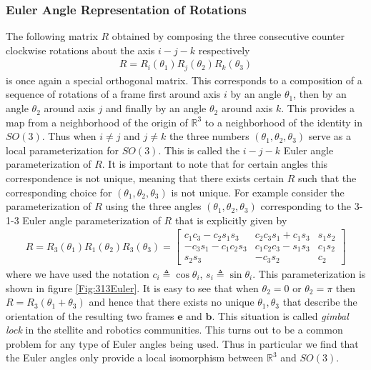 \documentclass[graybox,envcountchap,sectrefs]{svmonoMuga}
\begin{document}




\subsubsection{Euler Angle Representation of Rotations}\label{Secn:EulerAngles}



The following matrix $R$ obtained by composing the three consecutive counter clockwise rotations about the axis $i-j-k$ respectively 
\begin{align}\label{eq:EulerAngles}
R=R_i(\theta_1)R_j(\theta_2)R_k(\theta_3)
\end{align}
is once again a special orthogonal matrix. This corresponds to a composition of a sequence of rotations of a frame first around axis $i$ by an angle $\theta_1$, then by an angle $\theta_2$ around axis $j$ and finally by an angle $\theta_2$ around axis $k$. This provides a map from a neighborhood of the origin of $\mathbb{R}^3$ to a neighborhood of the identity in $SO(3)$. Thus when $i\neq j$ and $j\neq k$ the three numbers $(\theta_1,\theta_2,\theta_3)$ serve as a local parameterization for $SO(3)$. This is called the $i-j-k$ Euler angle parameterization of $R$. It is 
important to note that for certain angles this correspondence is not unique, meaning that there exists certain $R$ such that the corresponding choice for $(\theta_1,\theta_2,\theta_3)$ is not unique.
For example consider the parameterization of $R$ using the three angles $(\theta_1,\theta_2,\theta_3)$ corresponding to the 3-1-3 Euler angle parameterization of $R$ that is explicitly given by
\begin{align}\label{eq:EulerAngles313}
R=R_3(\theta_1)R_1(\theta_2)R_3(\theta_3)=\begin{bmatrix}
c_1c_3-c_2s_1s_3 & c_2c_3s_1+c_1s_3 & s_1s_2  \\
-c_3s_1-c_1c_2s_3 & c_1c_2c_3-s_1s_3 & c_1s_2\\
s_2s_3 & -c_3s_2 & c_2\end{bmatrix}
\end{align}
where we have used the notation $c_i\triangleq \cos{\theta_i}$, $s_i\triangleq \sin{\theta_i}$. This parameterization is shown in figure \ref{Fig:313Euler}. 
It is easy to see that  when $\theta_2=0$ or $\theta_2=\pi$ then $R=R_3(\theta_1+\theta_3)$ and hence that there exists no unique $\theta_1,\theta_3$ that describe the orientation of the resulting two frames $\mathbf{e}$ and $\mathbf{b}$. This situation is called \emph{gimbal lock} in the stellite and robotics communities.
This turns out to be a common problem for any type of Euler angles being used. Thus in particular we find that the Euler angles only provide a local isomorphism between $\mathbb{R}^3$ and $SO(3)$.
\end{document}
